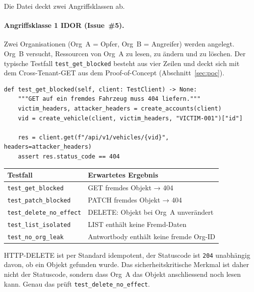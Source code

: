 Die Datei deckt zwei Angriffsklassen ab.

\paragraph{Angriffsklasse 1 \textendash{} IDOR (Issue~\#5).}
Zwei Organisationen (Org~A = Opfer, Org~B = Angreifer) werden angelegt.
Org~B versucht, Ressourcen von Org~A zu lesen, zu ändern und zu
löschen. Der typische Testfall \texttt{test\_get\_blocked} besteht aus
vier Zeilen und deckt sich mit dem Cross-Tenant-GET aus dem
Proof-of-Concept (Abschnitt~\ref{sec:poc}).

\begin{lstlisting}[style=custompython, caption={\texttt{TestIDOR.test\_get\_blocked} \textendash{} Cross-Tenant-GET auf ein Fahrzeug des Opfers.}]
def test_get_blocked(self, client: TestClient) -> None:
    """GET auf ein fremdes Fahrzeug muss 404 liefern."""
    victim_headers, attacker_headers = create_accounts(client)
    vid = create_vehicle(client, victim_headers, "VICTIM-001")["id"]

    res = client.get(f"/api/v1/vehicles/{vid}", headers=attacker_headers)
    assert res.status_code == 404
\end{lstlisting}

\begin{center}
      \begin{tabular}{|l|l|}
            \hline
            \textbf{Testfall}                 & \textbf{Erwartetes Ergebnis}            \\
            \hline
            \texttt{test\_get\_blocked}       & GET fremdes Objekt → 404                \\
            \texttt{test\_patch\_blocked}     & PATCH fremdes Objekt → 404              \\
            \texttt{test\_delete\_no\_effect} & DELETE: Objekt bei Org~A unverändert    \\
            \texttt{test\_list\_isolated}     & LIST enthält keine Fremd-Daten          \\
            \texttt{test\_no\_org\_leak}      & Antwortbody enthält keine fremde Org-ID \\
            \hline
      \end{tabular}
\end{center}

\vspace{0.5em}
\noindent HTTP-DELETE ist per Standard idempotent, der Statuscode ist
\texttt{204} unabhängig davon, ob ein Objekt gefunden wurde. Das
sicherheitskritische Merkmal ist daher nicht der Statuscode, sondern
dass Org~A das Objekt anschliessend noch lesen kann. Genau das prüft
\texttt{test\_delete\_no\_effect}.


